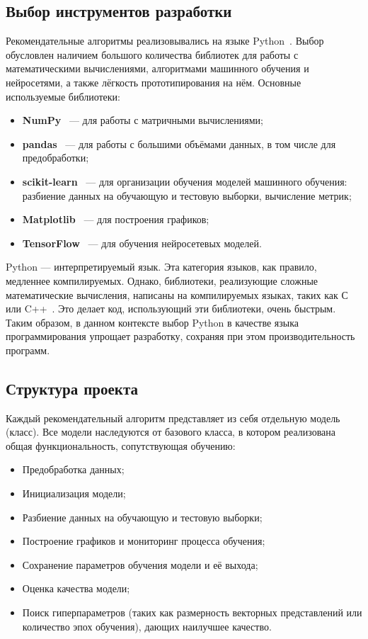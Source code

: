 \subsection{Выбор инструментов разработки}\label{subsec:development_tools}
Рекомендательные алгоритмы реализовывались на языке Python~\cite{python}.
Выбор обусловлен наличием большого количества библиотек для работы с математическими вычислениями, алгоритмами машинного обучения и нейросетями, а также лёгкость прототипирования на нём.
Основные используемые библиотеки:
\begin{itemize}
    \item \textbf{NumPy}~\cite{numpy} --- для работы с матричными вычислениями;
    \item \textbf{pandas}~\cite{pandas} --- для работы с большими объёмами данных, в том числе для предобработки;
    \item \textbf{scikit-learn}~\cite{scikit-learn} --- для организации обучения моделей машинного обучения: разбиение данных на обучающую и тестовую выборки, вычисление метрик;
    \item \textbf{Matplotlib}~\cite{matplotlib} --- для построения графиков;
    \item \textbf{TensorFlow}~\cite{tensorflow} --- для обучения нейросетевых моделей.
\end{itemize}

Python --- интерпретируемый язык.
Эта категория языков, как правило, медленнее компилируемых.
Однако, библиотеки, реализующие сложные математические вычисления, написаны на компилируемых языках, таких как С~\cite{c-language} или C++~\cite{c++}.
Это делает код, использующий эти библиотеки, очень быстрым.
Таким образом, в данном контексте выбор Python в качестве языка программирования упрощает разработку, сохраняя при этом производительность программ.

\pagebreak
\subsection{Структура проекта}\label{subsec:project_structure}
Каждый рекомендательный алгоритм представляет из себя отдельную модель (класс).
Все модели наследуются от базового класса, в котором реализована общая функциональность, сопутствующая обучению:
\begin{itemize}
    \item Предобработка данных;
    \item Инициализация модели;
    \item Разбиение данных на обучающую и тестовую выборки;
    \item Построение графиков и мониторинг процесса обучения;
    \item Сохранение параметров обучения модели и её выхода;
    \item Оценка качества модели;
    \item Поиск гиперпараметров (таких как размерность векторных представлений или количество эпох обучения), дающих наилучшее качество.
\end{itemize}

